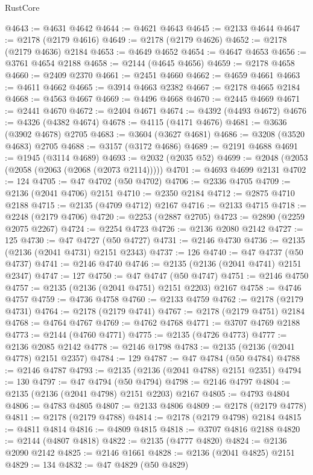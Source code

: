 \begin{lexlean}{RustCore}
\begin{coremodule}
@4643 := @4631 @4642
@4644 := @4621 @4643
@4645 := @2133 @4644
@4647 := @2178 (@2179 @4616)
@4649 := @2178 (@2179 @4626)
@4652 := @2178 (@2179 @4636) @2184
@4653 := @4649 @4652
@4654 := @4647 @4653
@4656 := @3761 @4654 @2188
@4658 := @2144 (@4645 @4656)
@4659 := @2178 @4658
@4660 := @2409 @2370
@4661 := @2451 @4660
@4662 := @4659 @4661
@4663 := @4611 @4662
@4665 := @3914 @4663 @2382
@4667 := @2178 @4665 @2184
@4668 := @4563 @4667
@4669 := @4496 @4668
@4670 := @2445 @4669
@4671 := @2441 @4670
@4672 := @2404 @4671
@4674 := @4392 (@4493 @4672)
@4676 := @4326 (@4382 @4674)
@4678 := @4115 (@4171 @4676)
@4681 := @3636 (@3902 @4678) @2705
@4683 := @3604 (@3627 @4681)
@4686 := @3208 (@3520 @4683) @2705
@4688 := @3157 (@3172 @4686)
@4689 := @2191 @4688
@4691 := @1945 (@3114 @4689)
@4693 := @2032 (@2035 @52)
@4699 := @2048 (@2053 (@2058 (@2063 (@2068 (@2073 @2114)))))
@4701 := @4693 @4699 @2131
@4702 := 124
@4705 := @47 @4702 (@50 @4702)
@4706 := @2336 @4705
@4709 := @2136 (@2041 @4706) @2151
@4710 := @2350 @2184
@4712 := @2875 @4710 @2188
@4715 := @2135 (@4709 @4712) @2167
@4716 := @2133 @4715
@4718 := @2248 (@2179 @4706)
@4720 := @2253 (@2887 @2705)
@4723 := @2890 (@2259 @2075 @2267)
@4724 := @2254 @4723
@4726 := @2136 @2080 @2142
@4727 := 125
@4730 := @47 @4727 (@50 @4727)
@4731 := @2146 @4730
@4736 := @2135 (@2136 (@2041 @4731) @2151 @2343)
@4737 := 126
@4740 := @47 @4737 (@50 @4737)
@4741 := @2146 @4740
@4746 := @2135 (@2136 (@2041 @4741) @2151 @2347)
@4747 := 127
@4750 := @47 @4747 (@50 @4747)
@4751 := @2146 @4750
@4757 := @2135 (@2136 (@2041 @4751) @2151 @2203) @2167
@4758 := @4746 @4757
@4759 := @4736 @4758
@4760 := @2133 @4759
@4762 := @2178 (@2179 @4731)
@4764 := @2178 (@2179 @4741)
@4767 := @2178 (@2179 @4751) @2184
@4768 := @4764 @4767
@4769 := @4762 @4768
@4771 := @3707 @4769 @2188
@4773 := @2144 (@4760 @4771)
@4775 := @2135 (@4726 @4773)
@4777 := @2136 @2085 @2142
@4778 := @2146 @1798
@4783 := @2135 (@2136 (@2041 @4778) @2151 @2357)
@4784 := 129
@4787 := @47 @4784 (@50 @4784)
@4788 := @2146 @4787
@4793 := @2135 (@2136 (@2041 @4788) @2151 @2351)
@4794 := 130
@4797 := @47 @4794 (@50 @4794)
@4798 := @2146 @4797
@4804 := @2135 (@2136 (@2041 @4798) @2151 @2203) @2167
@4805 := @4793 @4804
@4806 := @4783 @4805
@4807 := @2133 @4806
@4809 := @2178 (@2179 @4778)
@4811 := @2178 (@2179 @4788)
@4814 := @2178 (@2179 @4798) @2184
@4815 := @4811 @4814
@4816 := @4809 @4815
@4818 := @3707 @4816 @2188
@4820 := @2144 (@4807 @4818)
@4822 := @2135 (@4777 @4820)
@4824 := @2136 @2090 @2142
@4825 := @2146 @1661
@4828 := @2136 (@2041 @4825) @2151
@4829 := 134
@4832 := @47 @4829 (@50 @4829)

\end{coremodule}
\end{lexlean}
